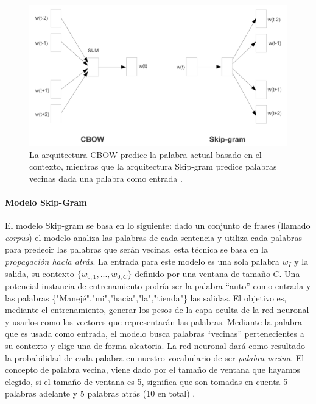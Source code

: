 \begin{figure}[h!]
	\centering
	\includegraphics[width=0.7\linewidth]{7_marco_teorico/imagenes/cbow_skipgram.jpg}
	\caption{La arquitectura CBOW predice la palabra actual basado en el contexto, mientras que la arquitectura Skip-gram predice palabras vecinas dada una palabra como entrada \citep{mikolov2013efficient}.}
	\label{fig:cbowskipgram}
\end{figure}

\paragraph{Modelo Skip-Gram}
El modelo Skip-gram se basa en lo siguiente: dado un conjunto de frases (llamado \textit{corpus}) el modelo analiza las palabras de cada sentencia y utiliza cada palabras para predecir las palabras que serán vecinas, esta técnica se basa en la \textit{propagación hacia atrás}. La entrada para este modelo es una sola palabra \(w_I\) y la salida, su contexto \(\{w_{0,1},..., w_{0,C}\}\) definido por una ventana de tamaño \(C\). Una potencial instancia de entrenamiento podría ser la palabra “auto” como entrada y las palabras \{"Manejé","mi","hacia","la","tienda"\} las salidas. El objetivo es, mediante el entrenamiento, generar los pesos de la capa oculta de la red neuronal y usarlos como los vectores que representarán las palabras. Mediante la palabra que es usada como entrada, el modelo busca palabras “vecinas” pertenecientes a su contexto y elige una de forma aleatoria. La red neuronal dará como resultado la probabilidad de cada palabra en nuestro vocabulario de ser \textit{palabra vecina}. El concepto de palabra vecina, viene dado por el tamaño de ventana que hayamos elegido, si el tamaño de ventana es 5, significa que son tomadas en cuenta 5 palabras adelante y 5 palabras atrás (10 en total) \citep{skipgrammodel}.

